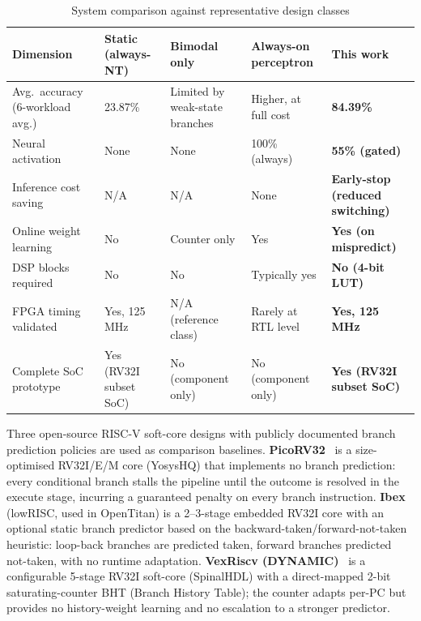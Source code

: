 \documentclass[12pt,a4paper]{article}
\begin{document}
\begin{table}[htbp]
  \centering
  \small
  \setlength{\tabcolsep}{4pt}
  \caption{System comparison against representative design classes}
  \label{tab:comparison}
  \begin{tabularx}{\linewidth}{p{3.0cm}YYYY}
    \toprule
    \textbf{Dimension}
      & \textbf{Static (always-NT)}
      & \textbf{Bimodal only}
      & \textbf{Always-on perceptron}
      & \textbf{This work} \\
    \midrule
    Avg.\ accuracy (6-workload avg.)
      & 23.87\%
      & Limited by weak-state branches
      & Higher, at full cost
      & \textbf{84.39\%} \\[3pt]
    Neural activation
      & None
      & None
      & 100\% (always)
      & \textbf{55\% (gated)} \\[3pt]
    Inference cost saving
      & N/A
      & N/A
      & None
      & \textbf{Early-stop (reduced switching)} \\[3pt]
    Online weight learning
      & No
      & Counter only
      & Yes
      & \textbf{Yes (on mispredict)} \\[3pt]
    DSP blocks required
      & No
      & No
      & Typically yes
      & \textbf{No (4-bit LUT)} \\[3pt]
    FPGA timing validated
      & Yes, 125\,MHz
      & N/A (reference class)
      & Rarely at RTL level
      & \textbf{Yes, 125\,MHz} \\[3pt]
    Complete SoC prototype
      & Yes (RV32I subset SoC)
      & No (component only)
      & No (component only)
      & \textbf{Yes (RV32I subset SoC)} \\
    \bottomrule
  \end{tabularx}
\end{table}

Three open-source RISC-V soft-core designs with publicly documented branch
prediction policies are used as comparison baselines.
\textbf{PicoRV32}~\cite{picorv32} is a size-optimised RV32I/E/M core
(YosysHQ) that implements no branch prediction: every conditional branch
stalls the pipeline until the outcome is resolved in the execute stage,
incurring a guaranteed penalty on every branch instruction.
\textbf{Ibex}~\cite{ibex} (lowRISC, used in OpenTitan) is a 2--3-stage
embedded RV32I core with an optional static branch predictor based on the
backward-taken/forward-not-taken heuristic: loop-back branches are predicted
taken, forward branches predicted not-taken, with no runtime adaptation.
\textbf{VexRiscv (DYNAMIC)}~\cite{vexriscv} is a configurable 5-stage RV32I
soft-core (SpinalHDL) with a direct-mapped 2-bit saturating-counter BHT
(Branch History Table); the counter adapts per-PC but provides no
history-weight learning and no escalation to a stronger predictor.
\end{document}
